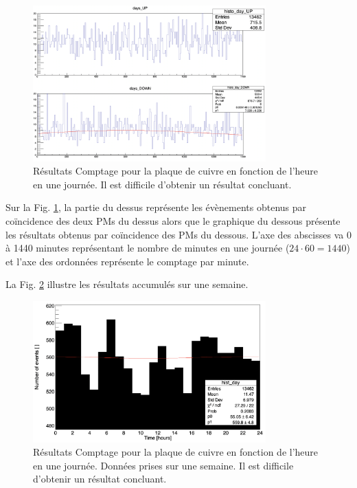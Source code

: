 \documentclass[12pt]{article}
\begin{document}
\begin{figure}[htpb!]
    \centering
    \includegraphics[width=0.8\textwidth]{graphiques/experience1/cuivre/OSCILLATION_JOUR_CUIVRE.png}
    \caption{Résultats Comptage pour la plaque de cuivre en fonction de l'heure en une journée. Il est difficile d'obtenir un résultat concluant.}
    \label{fig:oscillation_jour_cuivre}
\end{figure}

Sur la Fig. \ref{fig:oscillation_jour_cuivre}, la partie du dessus représente les évènements obtenus par coïncidence des deux PMs du dessus alors que le graphique du dessous présente les résultats obtenus par coïncidence des PMs du dessous. L'axe des abscisses va 0 à 1440 minutes représentant le nombre de minutes en une journée ($24\cdot60=1440$) et l'axe des ordonnées représente le comptage par minute.

La Fig. \ref{fig:oscillation_jour_cuivre_total} illustre les résultats accumulés sur une semaine.

\begin{figure}[htpb!]
    \centering
    \includegraphics[width=0.8\textwidth]{graphiques/experience1/cuivre/oscillation_jour_cuivre_total_comptage.png}
    \caption{Résultats Comptage pour la plaque de cuivre en fonction de l'heure en une journée. Données prises sur une semaine. Il est difficile d'obtenir un résultat concluant.}
    \label{fig:oscillation_jour_cuivre_total}
\end{figure}
\end{document}
